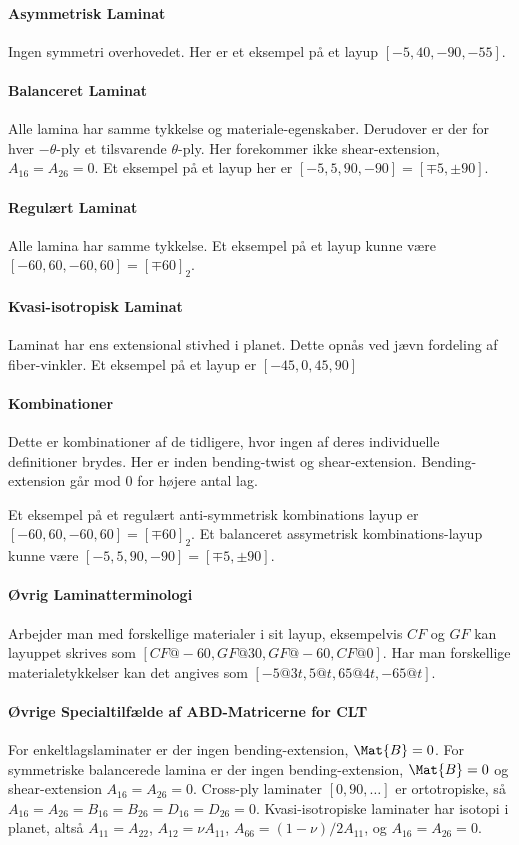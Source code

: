 \paragraph{Asymmetrisk Laminat}
Ingen symmetri overhovedet.
Her er et eksempel på et layup $[-5,40,-90,-55]$.

\paragraph{Balanceret Laminat}
Alle lamina har samme tykkelse og materiale-egenskaber.
Derudover er der for hver $-\theta$-ply et tilsvarende $\theta$-ply.
Her forekommer ikke shear-extension, $A_{16} = A_{26} = 0$.
Et eksempel på et layup her er $[-5,5,90,-90]=[\mp 5, \pm 90]$.

\paragraph{Regulært Laminat}
Alle lamina har samme tykkelse.
Et eksempel på et layup kunne være $[-60,60,-60,60]=[\mp60]_2$.

\paragraph{Kvasi-isotropisk Laminat}
Laminat har ens extensional stivhed i planet.
Dette opnås ved jævn fordeling af fiber-vinkler.
Et eksempel på et layup er $[-45,0,45,90]$

\paragraph{Kombinationer}
Dette er kombinationer af de tidligere, hvor ingen af deres individuelle definitioner brydes.
Her er inden bending-twist og shear-extension.
Bending-extension går mod 0 for højere antal lag.

Et eksempel på et regulært anti-symmetrisk kombinations layup er $[-60,60,-60,60]=[\mp60]_2$.
Et balanceret assymetrisk kombinations-layup kunne være $[-5,5,90,-90]=[\mp5, \pm90]$.

\paragraph{Øvrig Laminatterminologi}
Arbejder man med forskellige materialer i sit layup, eksempelvis $CF$ og $GF$ kan layuppet skrives som $[CF@-60,GF@30,GF@-60,CF@0]$.
Har man forskellige materialetykkelser kan det angives som $[-5@3t,5@t,65@4t,-65@t]$.

\paragraph{Øvrige Specialtilfælde af ABD-Matricerne for CLT}
For enkeltlagslaminater er der ingen bending-extension, $\Mat{B} = 0$.
For symmetriske balancerede lamina er der ingen bending-extension, $\Mat{B} = 0$ og shear-extension $A_{16} = A_{26} = 0$.
Cross-ply laminater $[0,90,\ldots ]$ er ortotropiske, så $A_{16} = A_{26} = B_{16} = B_{26} = D_{16} = D_{26} = 0$.
Kvasi-isotropiske laminater har isotopi i planet, altså $A_{11} = A_{22}$, $A_{12} = \nu A_{11}$, $A_{66} = (1-\nu) / 2 A_{11}$, og $A_{16} = A_{26} = 0$.
